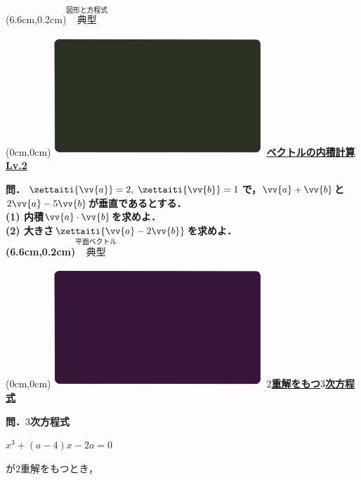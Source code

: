 \documentclass[10pt,
fleqn,
dvipdfmx,
uplatex
]{jsarticle}
\begin{document}
\at(6.6cm,0.2cm){\small\color{bradorange}$\overset{\text{図形と方程式}}{\text{典型}}$}



\newpage



\at(0cm,0cm){\includegraphics[width=8cm,bb=0 0 1920 1080]{./youtube/thumbnails/templates/smart_background/平面ベクトル.jpeg}}
{\color{orange}\bf\boldmath\Large\underline{ベクトルの内積計算 Lv.2 }}\vspace{0.3zw}

\normalsize 
\bf\boldmath 問．$\zettaiti{\vv {a}}=2,\;\zettaiti{\vv {b}}=1$で，$\vv {a}+\vv {b}$と$2\vv {a}-5\vv {b}$が垂直であるとする．\\
(1)  内積$\vv {a}\cdot \vv {b}$を求めよ．\\
(2)  大きさ$\zettaiti{\vv {a}-2\vv {b}}$を求めよ．\\

\at(6.6cm,0.2cm){\small\color{bradorange}$\overset{\text{平面ベクトル}}{\text{典型}}$}


\newpage

\at(0cm,0cm){\includegraphics[width=8cm,bb=0 0 1920 1080]{./youtube/thumbnails/templates/smart_background/複素数と方程式.jpeg}}
{\color{orange}\bf\boldmath\Large\underline{$2$重解をもつ$3$次方程式}}\vspace{0.1zw}

\LARGE 
\bf\boldmath 問．$3$次方程式

\hspace{0.2zw}$x^3+\left(a-4\right)x-2a=0$

が$2$重解をもつとき，
\end{document}

